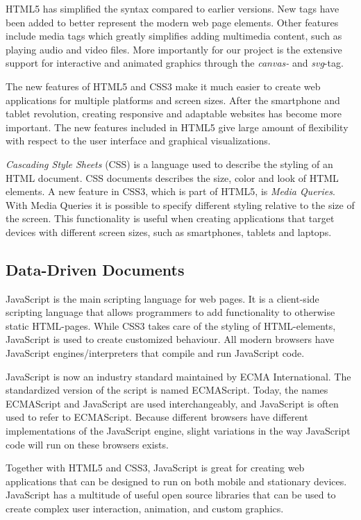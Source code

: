 HTML5 has simplified the syntax compared to earlier versions. New tags have been added to better represent the modern web page elements. Other features include media tags which greatly simplifies adding multimedia content, such as playing audio and video files. More importantly for our project is the extensive support for interactive and animated graphics through the \emph{canvas-} and \emph{svg}-tag.

The new features of HTML5 and CSS3 make it much easier to create web applications for multiple platforms and screen sizes. After the smartphone and tablet revolution, creating responsive and adaptable websites has become more important. The new features included in HTML5 give large amount of flexibility with respect to the user interface and graphical visualizations.

\emph{Cascading Style Sheets} (CSS) is a language used to describe the styling of an HTML document. CSS documents describes the size, color and look of HTML elements. A new feature in CSS3, which is part of HTML5, is \emph{Media Queries}. With Media Queries it is possible to specify different styling relative to the size of the screen. This functionality is useful when creating applications that target devices with different screen sizes, such as smartphones, tablets and laptops. 

\subsection{Data-Driven Documents}
JavaScript is the main scripting language for web pages. It is a client-side scripting language that allows programmers to add functionality to otherwise static HTML-pages. While CSS3 takes care of the styling of HTML-elements, JavaScript is used to create customized behaviour. All modern browsers have JavaScript engines/interpreters that compile and run JavaScript code.

JavaScript is now an industry standard maintained by ECMA International. The standardized version of the script is named ECMAScript. Today, the names ECMAScript and JavaScript are used interchangeably, and JavaScript is often used to refer to ECMAScript. Because different browsers have different implementations of the JavaScript engine, slight variations in the way JavaScript code will run on these browsers exists.

Together with HTML5 and CSS3, JavaScript is great for creating web applications that can be designed to run on both mobile and stationary devices. JavaScript has a multitude of useful open source libraries that can be used to create complex user interaction, animation, and custom graphics.

